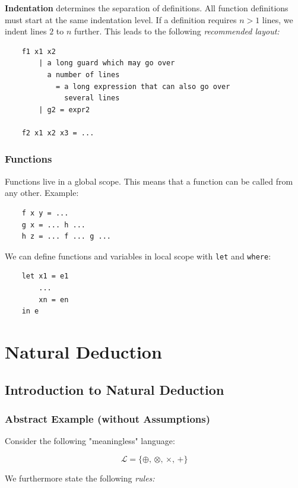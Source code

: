 \documentclass[a4paper]{extarticle}
\begin{document}
\textbf{Indentation} determines the separation of definitions. All function definitions must start at the same indentation level. If a definition requires \(n > 1\) lines, we indent lines \(2\) to \(n\) further. This leads to the following \textit{recommended layout:}

\begin{verbatim}
    f1 x1 x2
        | a long guard which may go over
          a number of lines
            = a long expression that can also go over
              several lines
        | g2 = expr2
    
    f2 x1 x2 x3 = ...
\end{verbatim}

\subsubsection{Functions}

Functions live in a global scope. This means that a function can be called from any other. Example:

\begin{verbatim}
    f x y = ...
    g x = ... h ...
    h z = ... f ... g ...
\end{verbatim}

We can define functions and variables in local scope with \verb|let| and \verb|where|:

\begin{verbatim}
    let x1 = e1
        ...
        xn = en
    in e
\end{verbatim}

\section{Natural Deduction}

\subsection{Introduction to Natural Deduction}

\subsubsection{Abstract Example (without Assumptions)}

Consider the following "meaningless" language:

\[
    \mathcal{L} = \{\oplus, \, \otimes, \, \times, \, +\}
\]

We furthermore state the following \textit{rules:}
\end{document}
